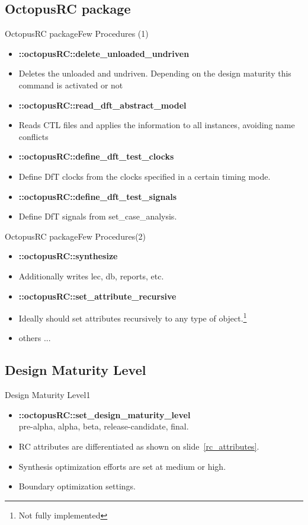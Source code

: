 \documentclass{beamer}
\begin{document}
\subsection{OctopusRC package}
\begin{frame}{OctopusRC package}{Few Procedures (1)}
	\begin{itemize}
	\item \textbf{::octopusRC::delete\_unloaded\_undriven} 
	\item []<2-|alert@2>Deletes the unloaded and undriven. Depending on the design maturity this command is activated or not
	\item \textbf{::octopusRC::read\_dft\_abstract\_model}
	\item []<3-|alert@3>Reads CTL files and applies the information to all instances, avoiding name conflicts
	\item \textbf{::octopusRC::define\_dft\_test\_clocks} 
	\item []<4-|alert@4>Define DfT clocks from the clocks specified in a certain timing mode.
	\item \textbf{::octopusRC::define\_dft\_test\_signals}
	\item []<5-|alert@5>Define DfT signals from set\_case\_analysis.
	\end{itemize}
\end{frame}

\begin{frame}{OctopusRC package}{Few Procedures(2)}
	\begin{itemize}
	\item \textbf{::octopusRC::synthesize} 
	\item []<2-|alert@2> Additionally writes lec, db, reports, etc.
	\item \textbf{::octopusRC::set\_attribute\_recursive}
	\item []<3-|alert@3> Ideally should set attributes recursively to any type of object.\footnote{Not fully implemented}
	\item <4-> others ...
	\end{itemize}
\end{frame}

\subsection{Design Maturity Level}
\begin{frame}{Design Maturity Level}{1}
	\begin{itemize}[<+->]
	\item \textbf{::octopusRC::set\_design\_maturity\_level} \\pre-alpha, alpha, beta, release-candidate, final.
	\item RC attributes are differentiated as shown on slide~\ref{rc_attributes}.
	\item Synthesis optimization efforts are set at medium or high.
	\item Boundary optimization settings.
	\end{itemize}
\end{frame}
\end{document}
